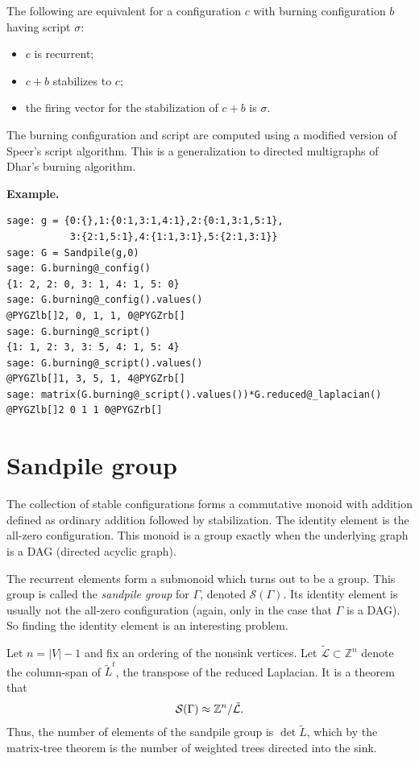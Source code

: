 \documentclass[letterpaper,10pt,english]{manual}
\begin{document}
The following are equivalent for a configuration $c$ with burning
configuration $b$ having script $\sigma$:
\begin{itemize}
\item {} 
$c$ is recurrent;

\item {} 
$c+b$ stabilizes to $c$;

\item {} 
the firing vector for the stabilization of $c+b$ is $\sigma$.

\end{itemize}

The burning configuration and script are computed using a modified
version of Speer's script algorithm.  This is a generalization to
directed multigraphs of Dhar's burning algorithm.

\textbf{Example.}

\begin{Verbatim}[commandchars=@\[\]]
sage: g = {0:{},1:{0:1,3:1,4:1},2:{0:1,3:1,5:1},
           3:{2:1,5:1},4:{1:1,3:1},5:{2:1,3:1}}
sage: G = Sandpile(g,0)
sage: G.burning@_config()
{1: 2, 2: 0, 3: 1, 4: 1, 5: 0}
sage: G.burning@_config().values()
@PYGZlb[]2, 0, 1, 1, 0@PYGZrb[]
sage: G.burning@_script()
{1: 1, 2: 3, 3: 5, 4: 1, 5: 4}
sage: G.burning@_script().values()
@PYGZlb[]1, 3, 5, 1, 4@PYGZrb[]
sage: matrix(G.burning@_script().values())*G.reduced@_laplacian()
@PYGZlb[]2 0 1 1 0@PYGZrb[]
\end{Verbatim}


\section{Sandpile group}

The collection of stable configurations forms a commutative monoid with
addition defined as ordinary addition followed by stabilization.  The identity
element is the all-zero configuration.  This monoid is a group
exactly when the underlying graph is a DAG (directed acyclic graph).

The recurrent elements form a submonoid which turns out to be a group.  This
group is called the \emph{sandpile group} for $\Gamma$, denoted
$\mathcal{S}(\Gamma)$.  Its identity element is usually not the all-zero
configuration (again, only in the case that $\Gamma$ is a DAG).  So finding the
identity element is an interesting problem.

Let $n=|V|-1$ and fix an ordering of the nonsink vertices. Let
$\mathcal{\tilde{L}}\subset\mathbb{Z}^n$ denote the column-span of
$\tilde{L}^t$, the transpose of the reduced Laplacian.  It is a theorem that
\begin{gather}
\begin{split}\mathcal{S}(\Gamma)\approx \mathbb{Z}^n/\mathcal{\tilde{L}}.\end{split}\notag
\end{gather}
Thus, the number of elements of the sandpile group is $\det{\tilde{L}}$, which
by the matrix-tree theorem is the number of weighted trees directed into the
sink.
\end{document}
